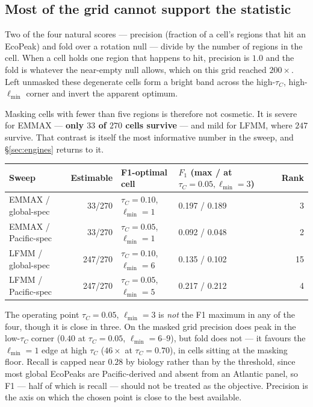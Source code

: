 \documentclass[11pt,a4paper]{article}
\begin{document}
\subsection{Most of the grid cannot support the statistic}

Two of the four natural scores --- precision (fraction of a cell's regions that hit an
EcoPeak) and fold over a rotation null --- divide by the number of regions in the cell.
When a cell holds one region that happens to hit, precision is $1.0$ and the fold is
whatever the near-empty null allows, which on this grid reached $200\times$. Left
unmasked these degenerate cells form a bright band across the high-$\tau_C$,
high-$\ell_{\min}$ corner and invert the apparent optimum.

Masking cells with fewer than five regions is therefore not cosmetic. It is severe for
EMMAX --- \textbf{only $33$ of $270$ cells survive} --- and mild for LFMM, where $247$ survive.
That contrast is itself the most informative number in the sweep, and \S\ref{sec:engines}
returns to it.

\begin{table}[h]\centering\small
\begin{tabular}{lrllr}\toprule
Sweep & Estimable & F1-optimal cell & $F_1$ (max / at $\tau_C{=}0.05,\ell_{\min}{=}3$) & Rank \\ \midrule
EMMAX / global-spec  & 33/270  & $\tau_C{=}0.10$, $\ell_{\min}{=}1$ & 0.197 / 0.189 & 3 \\
EMMAX / Pacific-spec & 33/270  & $\tau_C{=}0.05$, $\ell_{\min}{=}1$ & 0.092 / 0.048 & 2 \\
LFMM / global-spec   & 247/270 & $\tau_C{=}0.10$, $\ell_{\min}{=}6$ & 0.135 / 0.102 & 15 \\
LFMM / Pacific-spec  & 247/270 & $\tau_C{=}0.05$, $\ell_{\min}{=}5$ & 0.217 / 0.212 & 4 \\ \bottomrule
\end{tabular}
\end{table}

The operating point $\tau_C = 0.05$, $\ell_{\min} = 3$ is \emph{not} the F1 maximum in any
of the four, though it is close in three. On the masked grid precision does peak in the
low-$\tau_C$ corner ($0.40$ at $\tau_C = 0.05$, $\ell_{\min} = 6$--$9$), but fold does not
--- it favours the $\ell_{\min} = 1$ edge at high $\tau_C$ ($46\times$ at $\tau_C = 0.70$),
in cells sitting at the masking floor. Recall is capped near $0.28$ by biology rather than
by the threshold, since most global EcoPeaks are Pacific-derived and absent from an
Atlantic panel, so F1 --- half of which is recall --- should not be treated as the
objective. Precision is the axis on which the chosen point is close to the best available.
\end{document}
